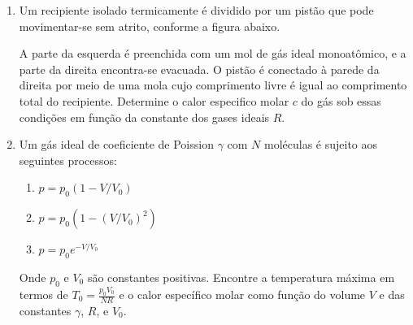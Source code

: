 \begin{enumerate}
    \item
        Um recipiente isolado termicamente é dividido por um pistão que pode
        movimentar-se sem atrito, conforme a figura abaixo.
        \begin{figure}[H]
            \centering
        \end{figure}
        A parte da esquerda é preenchida com um mol de gás ideal monoatômico, e
        a parte da direita encontra-se evacuada. O pistão é conectado à parede
        da direita por meio de uma mola cujo comprimento livre é igual ao
        comprimento total do recipiente. Determine o calor especifico molar $c$
        do gás sob essas condições em função da constante dos gases ideais $R$.

    \item
        Um gás ideal de coeficiente de Poission $\gamma$ com $N$ moléculas é
        sujeito aos seguintes processos:
        \begin{enumerate}
            \item
                $p=p_0(1-V/V_0)$
            \item
                $p=p_0(1-(V/V_0)^2)$
            \item
                $p=p_0e^{-V/V_0}$
        \end{enumerate}
        Onde $p_0$ e $V_0$ são constantes positivas. Encontre a temperatura
        máxima em termos de $T_0=\frac{p_0V_0}{NR}$ e o calor específico molar
        como função do volume $V$ e das constantes $\gamma$, $R$, e $V_0$.


\end{enumerate}

